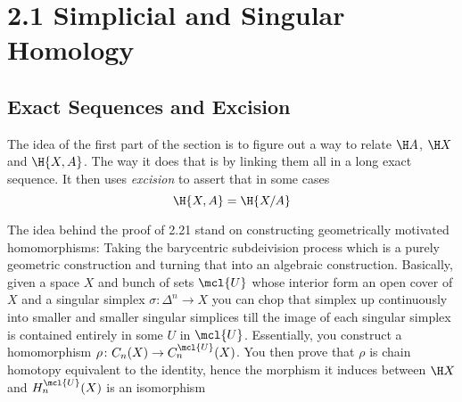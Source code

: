 \documentclass{pset}
\begin{document}
\section{2.1 Simplicial and Singular Homology}
\subsection{Exact Sequences and Excision}
\indent The idea of the first part of the section is to figure out a way to relate $\H A$, $\H X$ and $\H {X, A}$. The way it does that is by linking them all in a long exact sequence. It then uses \emph{excision} to assert that in some cases
\[\H {X, A} = \H {X/A}\]

The idea behind the proof of 2.21 stand on constructing geometrically motivated homomorphisms: Taking the barycentric subdeivision process which is a purely geometric construction and turning that into an algebraic construction. Basically, given a space $X$ and bunch of sets $\mcl{U}$ whose interior form an open cover of $X$ and a singular simplex $\sigma\colon\Delta^n\to X$ you can chop that simplex up continuously into smaller and smaller singular simplices till the image of each singular simplex is contained entirely in some $U$ in $\mcl{U}$. Essentially, you construct a homomorphism $\rho\colon C_n(X)\to C_n^\mcl{U}(X)$. You then prove that $\rho$ is chain homotopy equivalent to the identity, hence the morphism it induces between $\H X$ and $H_n^\mcl{U}(X)$ is an isomorphism
\end{document}
